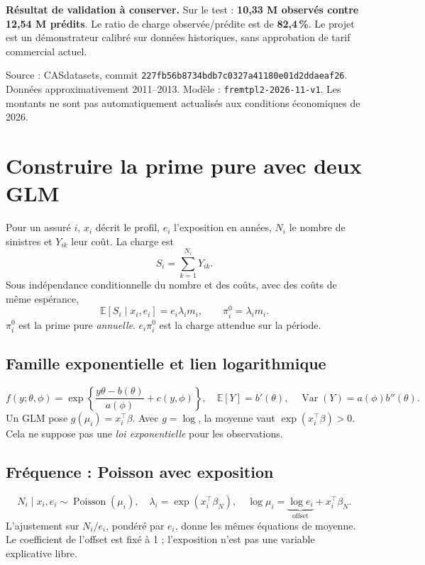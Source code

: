 \documentclass[11pt,a4paper]{article}
\newcommand{\E}{\mathbb E}
\newcommand{\Var}{\operatorname{Var}}
\newcommand{\Pois}{\operatorname{Poisson}}
\newcommand{\smallnote}[1]{{\small\color{Muted}#1}}
\begin{document}
\begin{limitbox}
\textbf{Résultat de validation à conserver.} Sur le test : \textbf{10,33 M\texteuro{} observés contre 12,54 M\texteuro{} prédits}. Le ratio de charge observée/prédite est de \textbf{82,4\,\%}. Le projet est un démonstrateur calibré sur données historiques, sans approbation de tarif commercial actuel.
\end{limitbox}

\smallnote{Source : CASdatasets, commit \texttt{227fb56b8734bdb7c0327a41180e01d2ddaeaf26}. Données approximativement 2011--2013. Modèle : \texttt{fremtpl2-2026-11-v1}. Les montants ne sont pas automatiquement actualisés aux conditions économiques de 2026.}

\newpage
\section{Construire la prime pure avec deux GLM}
Pour un assuré $i$, $x_i$ décrit le profil, $e_i$ l'exposition en années, $N_i$ le nombre de sinistres et $Y_{ik}$ leur coût. La charge est
\[
S_i=\sum_{k=1}^{N_i}Y_{ik}.
\]
Sous indépendance conditionnelle du nombre et des coûts, avec des coûts de même espérance,
\[
\boxed{\E[S_i\mid x_i,e_i]=e_i\lambda_i m_i,\qquad \pi_i^0=\lambda_i m_i.}
\]
$\pi_i^0$ est la prime pure \emph{annuelle}. $e_i\pi_i^0$ est la charge attendue sur la période.

\subsection*{Famille exponentielle et lien logarithmique}
\[
f(y;\theta,\phi)=\exp\!\left\{\frac{y\theta-b(\theta)}{a(\phi)}+c(y,\phi)\right\},
\quad \E[Y]=b'(\theta),\quad \Var(Y)=a(\phi)b''(\theta).
\]
Un GLM pose $g(\mu_i)=x_i^\top\beta$. Avec $g=\log$, la moyenne vaut $\exp(x_i^\top\beta)>0$. Cela ne suppose pas une \emph{loi exponentielle} pour les observations.

\subsection*{Fréquence : Poisson avec exposition}
\[
N_i\mid x_i,e_i\sim\Pois(\mu_i),\quad
\lambda_i=\exp(x_i^\top\beta_N),\quad
\log\mu_i=\underbrace{\log e_i}_{\text{offset}}+x_i^\top\beta_N.
\]
L'ajustement sur $N_i/e_i$, pondéré par $e_i$, donne les mêmes équations de moyenne. Le coefficient de l'offset est fixé à 1 ; l'exposition n'est pas une variable explicative libre.
\end{document}
